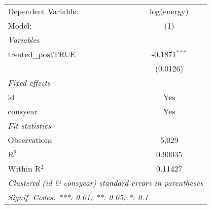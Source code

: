
\begingroup
\centering
\begin{tabular}{lc}
   \tabularnewline \midrule \midrule
   Dependent Variable: & log(energy)\\  
   Model:              & (1)\\  
   \midrule
   \emph{Variables}\\
   treated\_postTRUE   & -0.1871$^{***}$\\   
                       & (0.0126)\\   
   \midrule
   \emph{Fixed-effects}\\
   id                  & Yes\\  
   consyear            & Yes\\  
   \midrule
   \emph{Fit statistics}\\
   Observations        & 5,029\\  
   R$^2$               & 0.90035\\  
   Within R$^2$        & 0.11427\\  
   \midrule \midrule
   \multicolumn{2}{l}{\emph{Clustered (id \& consyear) standard-errors in parentheses}}\\
   \multicolumn{2}{l}{\emph{Signif. Codes: ***: 0.01, **: 0.05, *: 0.1}}\\
\end{tabular}
\par\endgroup


